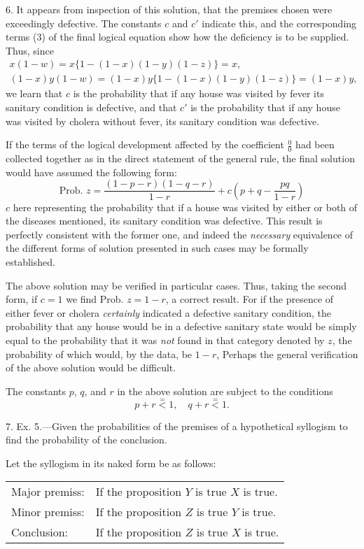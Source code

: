 \documentclass[oneside]{book}
\begin{document}
6. It appears from inspection of this solution, that the premises
chosen were exceedingly defective. The constants $c$ and
$c'$ indicate this, and the corresponding terms (3) of the final
logical equation show how the deficiency is to be supplied.
Thus, since
\[
\begin{array}{c}
x(1-w)=x\{1-(1-x)(1-y)(1-z)\}=x, \\
(1-x)y(1-w)=(1-x)y\{1-(1-x)(1-y)(1-z)\}=(1-x)y,
\end{array}
\]
we learn that $c$ is the probability that if any house was visited by
fever its sanitary condition is defective, and that $c'$ is the probability
that if any house was visited by cholera without fever, its
sanitary condition was defective.

If the terms of the logical development affected by the coefficient
$\frac{0}{0}$ had been collected together as in the direct statement of
the general rule, the final solution would have assumed the following form:
\[
  \text{Prob. }z = \frac{(1-p-r)(1-q-r)}{1-r}
+ c\left(p+q-\frac{pq}{1-r}\right)
\]
$c$ here representing the probability that if a house was visited by
either or both of the diseases mentioned, its sanitary condition
was defective. This result is perfectly consistent with the former
one, and indeed the \emph{necessary} equivalence of the different forms
of solution presented in such cases may be formally established.

The above solution may be verified in particular cases. Thus,
taking the second form, if $c = 1$ we find Prob. $z = 1-r$, a correct
result. For if the presence of either fever or cholera \emph{certainly}
indicated a defective sanitary condition, the probability that any
house would be in a defective sanitary state would be simply
equal to the probability that it was \emph{not} found in that category
denoted by $z$, the probability of which would, by the data, be $1-r$,
Perhaps the general verification of the above solution would be
difficult.

The constants $p$, $q$, and $r$ in the above solution are subject to
the conditions
\[
  p + r \stackrel{=}{<} 1, \quad  q + r \stackrel{=}{<} 1.
\]

7. Ex. 5.---Given the probabilities of the premises of a hypothetical syllogism to find the probability of the conclusion.

Let the syllogism in its naked form be as follows:

\begin{tabular}{ll}
  Major premiss: &If the proposition $Y$ is true $X$ is true.\\
  Minor premiss: &If the proposition $Z$ is true $Y$ is true.\\
  Conclusion:    &If the proposition $Z$ is true $X$ is true.
\end{tabular}
\end{document}
